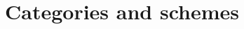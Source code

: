 \documentclass[12pt]{amsart}
\numberwithin{equation}{section}
\theoremstyle{definition}
\theoremstyle{remark}
\DeclareMathOperator{\FHilb}{FHilb}
\newcommand{\CC}{\mathbb{C}}
\newcommand{\cat}{\mathcal{C}}
\newcommand{\CM}{\mathcal{M}}
\newcommand{\CO}{\mathcal{O}}
\renewcommand{\1}{\mathbf{1}}
\newcommand{\coh}{\mathrm{Coh}}
\newcommand{\spec}{\mathrm{Spec}}
\begin{document}
\section{Categories and schemes}
\label{sec:geometry}


\end{document}
